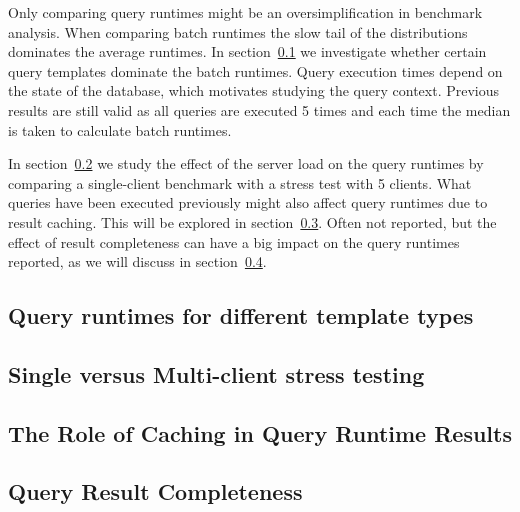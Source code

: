 

Only comparing query runtimes might be an oversimplification in benchmark analysis. 
When comparing batch runtimes the slow tail of the distributions dominates the average runtimes. In section~\ref{subsec:templates} we investigate whether certain query templates dominate the batch runtimes.
Query execution times depend on the state of the database, which motivates studying the query context. Previous results are still valid as all queries are executed 5 times and each time the median is taken to calculate batch runtimes.

In section~\ref{subsec:load} we study the effect of the server load on the query runtimes by comparing a single-client benchmark with a stress test with 5 clients. What queries have been executed previously might also affect query runtimes due to result caching. This will be explored in section~\ref{subsec:caching}. Often not reported, but the effect of result completeness can have a big impact on the query runtimes reported, as we will discuss in section~\ref{subsec:completeness}.

\subsection{Query runtimes for different template types}
\label{subsec:templates}


\subsection{Single versus Multi-client stress testing}
\label{subsec:load}


\subsection{The Role of Caching in Query Runtime Results}
\label{subsec:caching}






\subsection{Query Result Completeness}
\label{subsec:completeness}
